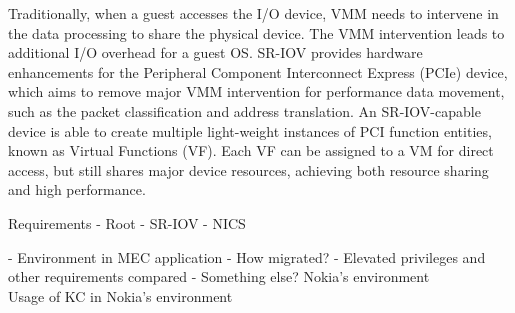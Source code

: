 Traditionally, when a guest accesses the I/O device, VMM needs to intervene in the data processing to share the physical device. The VMM intervention leads to additional I/O overhead for a guest OS. SR-IOV provides hardware enhancements for the Peripheral Component Interconnect Express (PCIe) device, which aims to remove major VMM intervention for performance data movement, such as the packet classification and address translation. An SR-IOV-capable device is able to create multiple light-weight instances of PCI function entities, known as Virtual Functions (VF). Each VF can be assigned to a VM for direct access, but still shares major device resources, achieving both resource sharing and high performance. \cite{Dong2012}





Requirements
- Root
- SR-IOV
- NICS

- Environment in MEC application
    - How migrated?
    - Elevated privileges and other requirements compared
    - Something else?
Nokia's environment \\
Usage of KC in Nokia's environment \\






